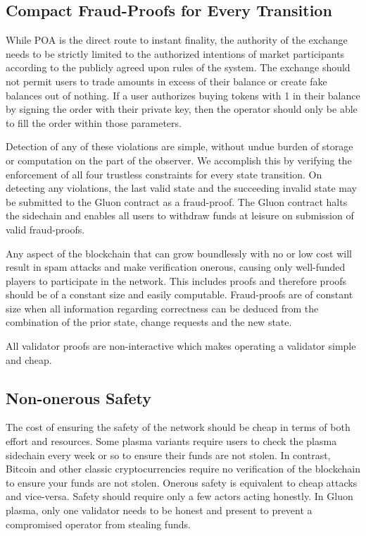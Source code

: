 \documentclass[12pt,a4paper]{article}
\begin{document}
\subsection{Compact Fraud-Proofs for Every Transition}

While POA is the direct route to instant finality, the authority of the exchange needs to be strictly limited to the authorized intentions of market participants according to the publicly agreed upon rules of the system. The exchange should not permit users to trade amounts in excess of their balance or create fake balances out of nothing. If a user authorizes buying  tokens with 1 in their balance by signing the order with their private key, then the operator should only be able to fill the order within those parameters.

Detection of any of these violations are simple, without undue burden of storage or computation on the part of the observer. We accomplish this by verifying the enforcement of all four trustless constraints for every state transition. On detecting any violations, the last valid state and the succeeding invalid state may be submitted to the Gluon contract as a fraud-proof. The Gluon contract halts the sidechain and enables all users to withdraw funds at leisure on submission of valid fraud-proofs.

Any aspect of the blockchain that can grow boundlessly with no or low cost will result in spam attacks and make verification onerous, causing only well-funded players to participate in the network. This includes proofs and therefore proofs should be of a constant size and easily computable. Fraud-proofs are of constant size when all information regarding correctness can be deduced from the combination of the prior state, change requests and the new state.

All validator proofs are non-interactive which makes operating a validator simple and cheap.

\subsection{Non-onerous Safety}
The cost of ensuring the safety of the network should be cheap in terms of both effort and resources. Some plasma variants require users to check the plasma sidechain every week or so to ensure their funds are not stolen. In contrast, Bitcoin and other classic cryptocurrencies require no verification of the blockchain to ensure your funds are not stolen. Onerous safety is equivalent to cheap attacks and vice-versa. Safety should require only a few actors acting honestly. In Gluon plasma, only one validator needs to be honest and present to prevent a compromised operator from stealing funds.
\end{document}
